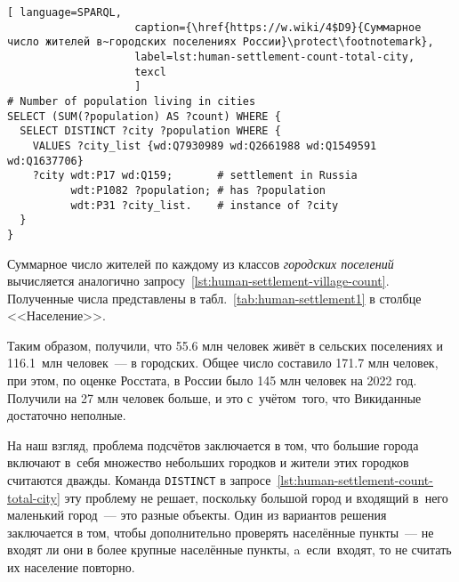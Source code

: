 \begin{lstlisting}[ language=SPARQL, 
                    caption={\href{https://w.wiki/4$D9}{Суммарное число жителей в~городских поселениях России}\protect\footnotemark},
                    label=lst:human-settlement-count-total-city,
                    texcl 
                    ]
# Number of population living in cities
SELECT (SUM(?population) AS ?count) WHERE {  
  SELECT DISTINCT ?city ?population WHERE {  
    VALUES ?city_list {wd:Q7930989 wd:Q2661988 wd:Q1549591 wd:Q1637706}
    ?city wdt:P17 wd:Q159;       # settlement in Russia
          wdt:P1082 ?population; # has ?population
          wdt:P31 ?city_list.    # instance of ?city
  }
}
\end{lstlisting}%

Суммарное число жителей по каждому из классов \emph{городских поселений} 
вычисляется аналогично запросу~\ref{lst:human-settlement-village-count}. 
Полученные числа представлены в табл.~\ref{tab:human-settlement1} в столбце <<Население>>. 

Таким образом, получили, что \num{55.6} млн человек живёт в сельских поселениях и \num{116.1}~млн человек~--- в городских. 
Общее число составило \num{171.7} млн человек, 
при этом, по оценке Росстата, в России было 145 млн человек на 2022 год. 
Получили на 27 млн человек больше, и это с~учётом~того, что Викиданные достаточно неполные. 

На наш взгляд, проблема подсчётов заключается в том, 
что большие города включают в~себя множество небольших городков и жители этих городков считаются дважды. 
Команда \lstinline|DISTINCT|%
%
%
%
%
в запросе~\ref{lst:human-settlement-count-total-city} 
эту проблему не решает, поскольку большой город и входящий в~него маленький город~--- это разные объекты. 
Один из вариантов решения заключается в том, 
чтобы дополнительно проверять населённые пункты~---  
не входят ли они в более крупные населённые пункты, 
a~если~входят, то не считать их население повторно. 




